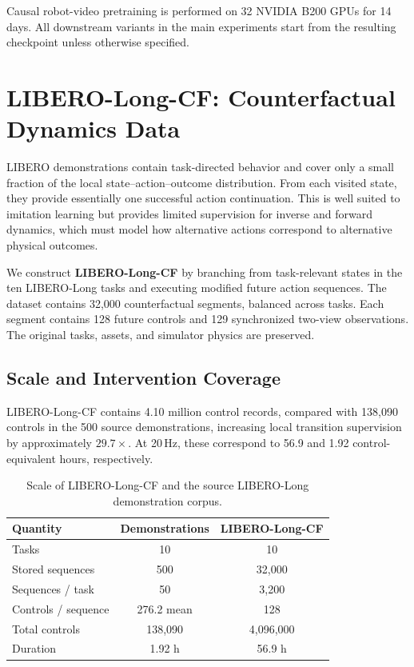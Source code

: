Causal robot-video pretraining is performed on 32 NVIDIA B200 GPUs for
14 days. All downstream \ours variants in the main experiments start from
the resulting checkpoint unless otherwise specified.



\section{LIBERO-Long-CF: Counterfactual Dynamics Data}
\label{app:libero-cf}

LIBERO demonstrations contain task-directed behavior and cover only a small
fraction of the local state--action--outcome distribution. From each visited
state, they provide essentially one successful action continuation. This is
well suited to imitation learning but provides limited supervision for inverse
and forward dynamics, which must model how alternative actions correspond to
alternative physical outcomes.

We construct \textbf{LIBERO-Long-CF} by branching from task-relevant states in
the ten LIBERO-Long tasks and executing modified future action sequences.
The dataset contains 32,000 counterfactual segments, balanced across tasks.
Each segment contains 128 future controls and 129 synchronized two-view
observations. The original tasks, assets, and simulator physics are preserved.

\subsection{Scale and Intervention Coverage}
\label{app:libero-cf-scale}

LIBERO-Long-CF contains 4.10 million control records, compared with 138,090
controls in the 500 source demonstrations, increasing local transition
supervision by approximately $29.7\times$. At 20\,Hz, these correspond to
56.9 and 1.92 control-equivalent hours, respectively.

\begin{table}[t]
    \centering
    \caption{
    Scale of LIBERO-Long-CF and the source LIBERO-Long demonstration corpus.
    }
    \label{tab:libero-cf-scale}
    \small
    \begin{tabular}{@{}lcc@{}}
        \toprule
        \textbf{Quantity}
        & \textbf{Demonstrations}
        & \textbf{LIBERO-Long-CF} \\
        \midrule
        Tasks
        & 10
        & 10 \\
        Stored sequences
        & 500
        & 32,000 \\
        Sequences / task
        & 50
        & 3,200 \\
        Controls / sequence
        & 276.2 mean
        & 128 \\
        Total controls
        & 138,090
        & 4,096,000 \\
        Duration
        & 1.92 h
        & 56.9 h \\
        \bottomrule
    \end{tabular}
\end{table}

